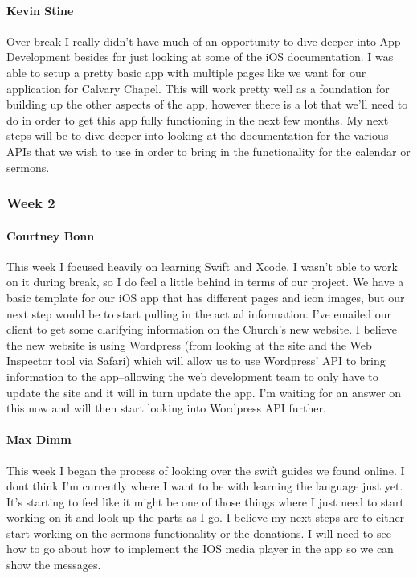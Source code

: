 \documentclass[letterpaper,10pt,draftclsnofoot,onecolumn,titlepage]{IEEEtran}
\begin{document}
			\paragraph{Kevin Stine}
			Over break I really didn't have much of an opportunity to dive deeper into App Development besides for just looking at some of the iOS documentation. I was able to setup a pretty basic app with multiple pages like we want for our application for Calvary Chapel. This will work pretty well as a foundation for building up the other aspects of the app, however there is a lot that we'll need to do in order to get this app fully functioning in the next few months. My next steps will be to dive deeper into looking at the documentation for the various APIs that we wish to use in order to bring in the functionality for the calendar or sermons.
			
		\subsubsection{Week 2}
		
			\paragraph{Courtney Bonn}
			This week I focused heavily on learning Swift and Xcode. I wasn't able to work on it during break, so I do feel a little behind in terms of our project. We have a basic template for our iOS app that has different pages and icon images, but our next step would be to start pulling in the actual information. I've emailed our client to get some clarifying information on the Church's new website. I believe the new website is using Wordpress (from looking at the site and the Web Inspector tool via Safari) which will allow us to use Wordpress' API to bring information to the app--allowing the web development team to only have to update the site and it will in turn update the app. I'm waiting for an answer on this now and will then start looking into Wordpress API further.

			\paragraph{Max Dimm}
			This week I began the process of looking over the swift guides we found online. I dont think I'm currently where I want to be with learning the language just yet. It's starting to feel like it might be one of those things where I just need to start working on it and look up the parts as I go. I believe my next steps are to either start working on the sermons functionality or the donations. I will need to see how to go about how to implement the IOS media player in the app so we can show the messages.
			
\end{document}
